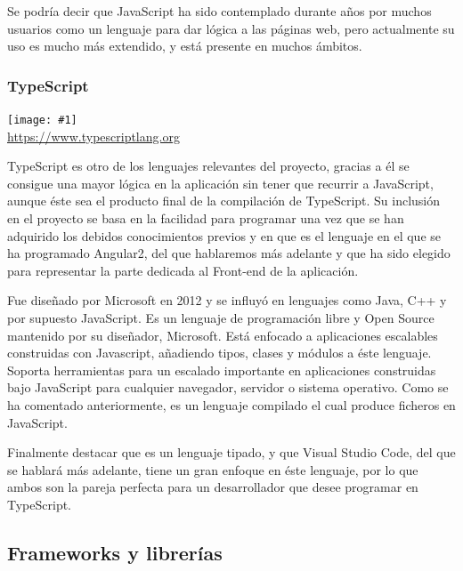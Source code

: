 \documentclass[11pt,openany]{book}
\newcommand{\logo}[2]{\medskip\begin{center}\texttt{[image: \#1]}\\\scriptsize\url{#2}\end{center}\bigskip}
\begin{document}
Se podría decir que JavaScript ha sido contemplado durante años por muchos usuarios como un lenguaje para dar lógica a las páginas web, pero actualmente su uso es mucho más extendido, y está presente en muchos ámbitos. 

\subsubsection{TypeScript}

\logo{logos/typescript.png}{https://www.typescriptlang.org}

TypeScript es otro de los lenguajes relevantes del proyecto, gracias a él se consigue una mayor lógica en la aplicación sin tener que recurrir a JavaScript, aunque éste sea el producto final de la compilación de TypeScript. Su inclusión en el proyecto se basa en la facilidad para programar una vez que se han adquirido los debidos conocimientos previos y en que es el lenguaje en el que se ha programado Angular2, del que hablaremos más adelante y que ha sido elegido para representar la parte dedicada al Front-end de la aplicación.

Fue diseñado por Microsoft en 2012 y se influyó en lenguajes como Java, C++ y por supuesto JavaScript\cite{2}. Es un lenguaje de programación libre y Open Source mantenido por su diseñador, Microsoft. Está enfocado a aplicaciones escalables construidas con Javascript, añadiendo tipos, clases y módulos a éste lenguaje. Soporta herramientas para un escalado importante en aplicaciones construidas bajo JavaScript para cualquier navegador, servidor o sistema operativo. Como se ha comentado anteriormente, es un lenguaje compilado el cual produce ficheros en JavaScript.

Finalmente destacar que es un lenguaje tipado, y que Visual Studio Code, del que se hablará más adelante, tiene un gran enfoque en éste lenguaje, por lo que ambos son la pareja perfecta para un desarrollador que desee programar en TypeScript.


\subsection{Frameworks y librerías}
\end{document}
